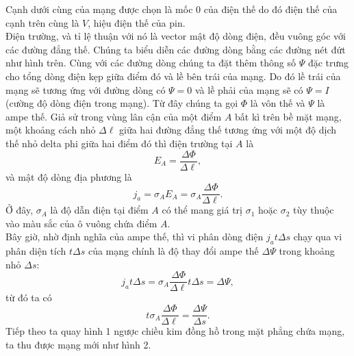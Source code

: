 \begin{loigiai}
\begin{center}
    \end{center}
    Cạnh dưới cùng của mạng được chọn là mốc $0$ của điện thế do đó điện thế của cạnh trên cùng là $V$, hiệu điện thế của pin. 
    \\Điện trường, và tỉ lệ thuận với nó là vector mật độ dòng điện, đều vuông góc với các đường đẳng thế. Chúng ta biểu diễn các đường dòng bằng các đường nét đứt như hình trên. Cùng với các đường dòng chúng ta đặt thêm thông số $\Psi$ đặc trưng cho tổng dòng điện kẹp giữa điểm đó và lề bên trái của mạng. Do đó lề trái của mạng sẽ tương ứng với đường dòng có $\Psi=0$ và lề phải của mạng sẽ có $\Psi=I$ (cường độ dòng điện trong mạng). Từ đây chúng ta gọi $\Phi$ là vôn thế và $\Psi$ là ampe thế.
    Giả sử trong vùng lân cận của một điểm $A$ bất kì trên bề mặt mạng, một khoảng cách nhỏ $\Delta \ell$ giữa hai đường đẳng thế tương ứng với một độ dịch thế nhỏ delta phi giữa hai điểm đó thì điện trường tại $A$ là
    $$E_A=\dfrac{\Delta\Phi}{\Delta\ell},$$
    và mật độ dòng địa phương là
    $$j_a=\sigma_A E_A=\sigma_A \dfrac{\Delta\Phi}{\Delta\ell}.$$
    Ở đây, $\sigma_A$ là độ dẫn điện tại điểm $A$ có thể mang giá trị $\sigma_1$ hoặc $\sigma_2$ tùy thuộc vào màu sắc của ô vuông chứa điểm $A$.
    \\Bây giờ, nhờ định nghĩa của ampe thế, thì vi phân dòng điện $j_at\Delta s$ chạy qua vi phân diện tích $t\Delta s$ của mạng chính là độ thay đổi ampe thế $\Delta \Psi$ trong khoảng nhỏ $\Delta s$:
    $$j_at\Delta s=\sigma_A \dfrac{\Delta\Phi}{\Delta\ell}t\Delta s=\Delta \Psi,$$
    từ đó ta có 
    $$t\sigma_A \dfrac{\Delta\Phi}{\Delta\ell}=\dfrac{\Delta\Psi}{\Delta s}.$$
    Tiếp theo ta quay hình 1 ngược chiều kim đồng hồ trong mặt phẳng chứa mạng, ta thu được mạng mới như hình 2.
    \begin{center}
        


\end{center}
\end{loigiai}

